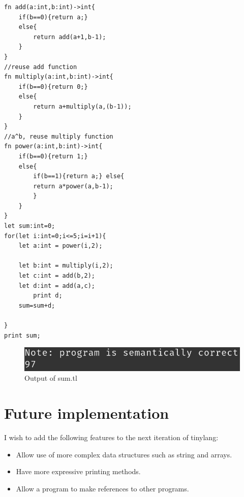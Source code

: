\begin{itemize}
	      	      	      
	      \begin{lstlisting}[basicstyle=\tiny,caption=sum.tl]
fn add(a:int,b:int)->int{
    if(b==0){return a;}
    else{
    	return add(a+1,b-1);
    }
}
//reuse add function
fn multiply(a:int,b:int)->int{
    if(b==0){return 0;}
    else{
    	return a+multiply(a,(b-1));
    }
}
//a^b, reuse multiply function
fn power(a:int,b:int)->int{
    if(b==0){return 1;}
    else{
    	if(b==1){return a;} else{
    	return a*power(a,b-1);
    	}
    }
}
let sum:int=0;
for(let i:int=0;i<=5;i=i+1){
	let a:int = power(i,2);
	
	let b:int = multiply(i,2);
	let c:int = add(b,2);
	let d:int = add(a,c);
		print d;
	sum=sum+d;

}
print sum;
	      \end{lstlisting}
	      \begin{figure}[H]
	      	\centering
	      	\includegraphics[scale=1.2]{Task345/images/sum.png}
	      	\caption{Output of sum.tl}
	      	\label{fig:output fibonacci}
	      \end{figure}
\end{itemize}
\section{Future implementation}
I wish to add the following features to the next iteration of tinylang:
\begin{itemize}
	\item Allow use of more complex data structures such as string and arrays.
	\item Have more expressive printing methods.
	\item Allow a program to make references to other programs.
\end{itemize}